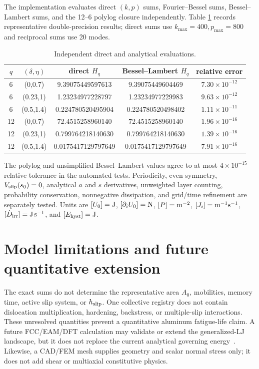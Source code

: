 \documentclass[11pt,letterpaper]{article}
\begin{document}
The implementation evaluates direct $(k,p)$ sums, Fourier--Bessel sums,
Bessel--Lambert sums, and the 12--6 polylog closure independently.  Table
\ref{tab:checks} records representative double-precision results; direct sums
use $k_{\max}=400,p_{\max}=800$ and reciprocal sums use 20 modes.
\begin{table}[h]
\centering
\begin{tabular}{ccccc}
\toprule $q$ & $(\delta,\eta)$ & direct $H_q$ & Bessel--Lambert $H_q$ & relative error\\\midrule
6 &(0,0.7)&9.39075449597613&9.39075449604469&$7.30\times10^{-12}$\\
6 &(0.23,1)&1.23234977228797&1.23234977229983&$9.63\times10^{-12}$\\
6 &(0.5,1.4)&0.224780520495904&0.224780520498402&$1.11\times10^{-11}$\\
12&(0,0.7)&72.4515258960140&72.4515258960140&$1.96\times10^{-16}$\\
12&(0.23,1)&0.799764218140630&0.799764218140630&$1.39\times10^{-16}$\\
12&(0.5,1.4)&0.0175417129797649&0.0175417129797649&$7.91\times10^{-16}$\\
\bottomrule
\end{tabular}
\caption{Independent direct and analytical evaluations.}
\label{tab:checks}
\end{table}
The polylog and unsimplified Bessel--Lambert values agree to at most
$4\times10^{-15}$ relative tolerance in the automated tests.  Periodicity,
even symmetry, $V_{\rm slip}(s_0)=0$, analytical $a$ and $s$ derivatives,
unweighted layer counting, probability conservation, nonnegative dissipation,
and grid/time refinement are separately tested.  Units are
$[U_0]={\rm J}$, $[\partial_iU_0]={\rm N}$,
$[P]={\rm m}^{-2}$, $[J_i]={\rm m}^{-1}{\rm s}^{-1}$,
$[\dot D_{\rm irr}]={\rm J\,s^{-1}}$, and $[E_{\rm hyst}]={\rm J}$.

\section{Model limitations and future quantitative extension}

The exact sums do not determine the representative area $A_0$, mobilities,
memory time, active slip system, or $h_{\rm slip}$.  One collective registry
does not contain dislocation multiplication, hardening, backstress, or
multiple-slip interactions.  These unresolved quantities prevent a
quantitative aluminum fatigue-life claim.  A future FCC/EAM/DFT calculation
may validate or extend the generalized-LJ landscape, but it does not replace
the current analytical governing energy~\cite{DawBaskes}.  Likewise, a CAD/FEM mesh supplies
geometry and scalar normal stress only; it does not add shear or multiaxial
constitutive physics.
\end{document}
